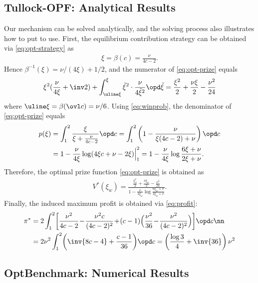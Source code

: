 \documentclass{sig-alternate-10pt}
\begin{document}
\subsection{Tullock-OPF: Analytical Results}
Our mechanism can be solved analytically, and the solving process also illustrates how to put  to use. First, the equilibrium contribution strategy can be obtained via \eqref{eq:opt-strategy} as
\begin{align}\label{eq:opf-strategy}
\xi = \beta(c) = \frac{\nu}{4c-2}.
\end{align}
Hence $\beta^{-1}(\xi)=\nu/(4\xi)+ 1/2$, and the numerator of \eqref{eq:opt-prize} equals
\begin{align*}
	\xi^2 (\frac{\nu}{4\xi}+ \inv 2) 
+ \int_{\uline \xi}^{\xi} \tilde\xi^2\cdot \frac{\nu}{4 \tilde\xi^2} \opd \tilde\xi
= \frac{\xi^2}{2} + \frac{\nu \xi}{2} - \frac{\nu^2}{24}
\end{align*}
where $\uline\xi=\beta(\ovl c)=\nu/6$. Using \eqref{eq:winprob}, the denominator of \eqref{eq:opt-prize} equals
\begin{align*}
p(\xi) &= \int_1^2 \frac{\xi}{\xi + \frac{\nu}{4c-2} }\opd c 
= \int_1^2 \left(1 - \frac{\nu}{\xi (4c-2) + \nu} \right) \opd c \\
&= 1 - \frac{\nu}{4\xi} \log(4\xi c +\nu -2\xi)\Big|_1^2
= 1 - \frac{\nu}{4\xi} \log\frac{6\xi +\nu}{2\xi +\nu}.
\end{align*}
Therefore, the optimal prize function \eqref{eq:opt-prize} is obtained as
\begin{align}\label{eq:opf-prize}
V^*(\xi_w) = \frac{\frac{\xi_w^2}{2} + \frac{\nu \xi_w}{2} - \frac{\nu^2}{24}}
	{1 - \frac{\nu}{4\xi_w} \log\frac{6\xi_w +\nu}{2\xi_w +\nu}}.
\end{align}
Finally, the induced maximum profit is obtained via \eqref{eq:profit}:
\begin{align}\label{eq:opf-profit}
\pi^* &= 2 \int_1^2 \!\left[ \frac{\nu^2}{4c-2}\! - \!\frac{\nu^2 c}{(4c-2)^2}
\!+\! (c-1) \Big(\frac{\nu^2}{36}\! -\! \frac{\nu^2}{(4c-2)^2}\Big) \right]\! \opd c \nn\\
&= 2 \nu^2 \int_1^2\! \left( \inv{8c-4} + \frac{c-1}{36} \right)\! \opd c 
= \left( \frac{\log 3}{4} + \inv{36} \right) \nu^2
\end{align}

\subsection{OptBenchmark: Numerical Results}
\end{document}
